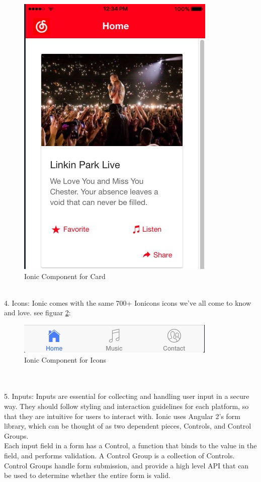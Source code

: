 \begin{figure}[h]
	\centering
	\includegraphics[scale=0.6]{img/ionicCard.png}
	\caption{Ionic Component for Card}
	\label{fig:6.8 cubed graph}
\end{figure} 
\\ 4. Icons: Ionic comes with the same 700+ Ionicons icons we’ve all come to know and love. see figuar \ref{fig:6.9 cubed graph}:
\begin{figure}[h]
	\centering
	\includegraphics[scale=0.6]{img/ionicIcon.png}
	\caption{Ionic Component for Icons}
	\label{fig:6.9 cubed graph}
\end{figure} \\ \\
5. Inputs: Inputs are essential for collecting and handling user input in a secure way. They should follow styling and interaction guidelines for each platform, so that they are intuitive for users to interact with. Ionic uses Angular 2’s form library, which can be thought of as two dependent pieces, Controls, and Control Groups.\\ 
Each input field in a form has a Control, a function that binds to the value in the field, and performs validation. A Control Group is a collection of Controls. Control Groups handle form submission, and provide a high level API that can be used to determine whether the entire form is valid.
